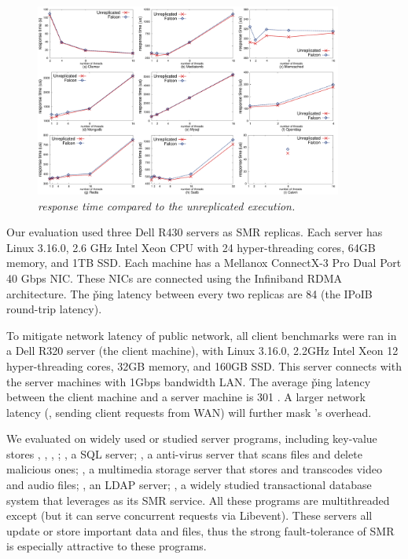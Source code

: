 \begin{figure}[t]
\centering
\includegraphics[width=0.9\textwidth]{figures/latency}
\vspace{-.10in}
\caption{\small {\em \xxx response time compared to the unreplicated
execution.}}
\vspace{-.20in}
\label{fig:latency}
\end{figure}

Our evaluation used three Dell R430 servers as SMR replicas. Each server has
Linux 3.16.0, 2.6 GHz Intel Xeon CPU with 24 hyper-threading cores, 64GB
memory, and 1TB SSD. Each machine has a Mellanox ConnectX-3 Pro Dual Port 40
Gbps NIC. These NICs are connected using the Infiniband RDMA architecture.
The \v{ping} latency between every two replicas are 84 \us (the IPoIB
round-trip latency).
%

To mitigate network latency of public network, all client benchmarks were ran
in a Dell R320 server (the client machine), with Linux 3.16.0, 2.2GHz Intel
Xeon 12 hyper-threading cores, 32GB memory, and 160GB SSD. This server
connects with the server machines with 1Gbps bandwidth LAN. The average
\v{ping} latency between the client machine and a server machine is 301 \us. A
larger network latency (\eg, sending client requests from WAN) will further
mask \xxx's overhead.

We evaluated \xxx on \nprog widely used or studied server programs, including
\nkvprog key-value stores \redis, \memcached, \ssdb, \mongodb; \mysql, a SQL
server; \clamav, a anti-virus server that scans files and delete malicious ones;
\mediatomb, a multimedia storage server that stores and transcodes video and
audio files; \openldap, an LDAP server; \calvin, a widely studied transactional
database system that leverages \zookeeper as its SMR service. All these programs
are multithreaded except \redis (but it can serve concurrent requests via
Libevent). These servers all update or store important data and files, thus the
strong fault-tolerance of SMR is especially attractive to these programs.


